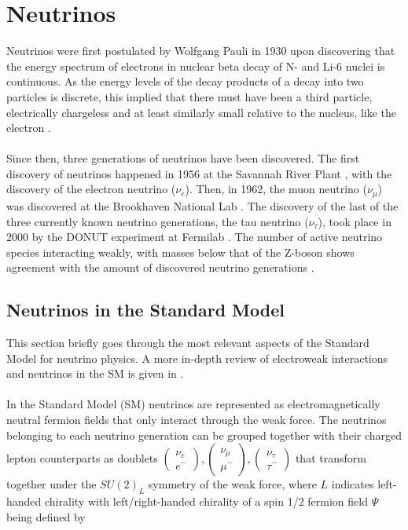 \documentclass[a4paper,12pt,numbered]{article}
\begin{document}
\section{Neutrinos}

Neutrinos were first postulated by Wolfgang Pauli in 1930 upon discovering that the energy spectrum of electrons in nuclear beta decay of N- and Li-6 nuclei is continuous. As the energy levels of the decay products of a decay into two particles is discrete, this implied that there must have been a third particle, electrically chargeless and at least similarly small relative to the nucleus, like the electron \cite{Pauli_Letter}.
\\ \\
Since then, three generations of neutrinos have been discovered. The first discovery of neutrinos happened in 1956 at the Savannah River Plant \cite{nuebar_discovery}, with the discovery of the electron neutrino ($\nu_e$). Then, in 1962, the muon neutrino ($\nu_\mu$) was discovered at the Brookhaven National Lab \cite{numu_discovery}. The discovery of the last of the three currently known neutrino generations, the tau neutrino ($\nu_\tau$), took place in 2000 by the DONUT experiment at Fermilab \cite{nutau_discovery}. The number of active neutrino species interacting weakly, with masses below that of the Z-boson shows agreement with the amount of discovered neutrino generations \cite{neunumber_constraints}.

\subsection{Neutrinos in the Standard Model}

This section briefly goes through the most relevant aspects of the Standard Model for neutrino physics. A more in-depth review of electroweak interactions and neutrinos in the SM is given in \cite{electroweak_lagrangian}.
\\ \\
In the Standard Model (SM) neutrinos are represented as electromagnetically neutral fermion fields that only interact through the weak force. The neutrinos belonging to each neutrino generation can be grouped together with their charged lepton counterparts as doublets $\begin{pmatrix} \nu_e \\ e^- \end{pmatrix}, \begin{pmatrix} \nu_\mu \\ \mu^- \end{pmatrix}, \begin{pmatrix} \nu_\tau \\ \tau^- \end{pmatrix}$ that transform together under the $SU(2)_L$ symmetry of the weak force, where $L$ indicates left-handed chirality  with left/right-handed chirality of a spin 1/2 fermion field $\Psi$ being defined by
\end{document}
